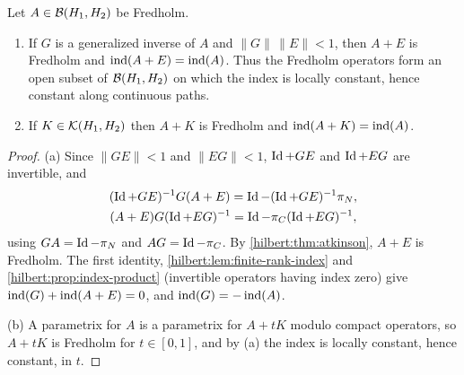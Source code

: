 \begin{theorem}\label{hilbert:thm:stability}
Let $A\in\mathcal{B}(H_1,H_2)$ be Fredholm.
\begin{enumerate}[label=\textup{(\alph*)}]
\item If $G$ is a generalized inverse of $A$ and $\|G\|\,\|E\|<1$, then $A+E$ is Fredholm and
$\operatorname{ind}(A+E)=\operatorname{ind}(A)$. Thus the Fredholm operators form an open subset of $\mathcal{B}(H_1,H_2)$ on
which the index is locally constant, hence constant along continuous paths.
\item If $K\in\mathcal{K}(H_1,H_2)$ then $A+K$ is Fredholm and $\operatorname{ind}(A+K)=\operatorname{ind}(A)$.
\end{enumerate}
\end{theorem}
\begin{proof}
(a) Since $\|GE\|<1$ and $\|EG\|<1$, $\operatorname{Id}+GE$ and $\operatorname{Id}+EG$ are invertible, and
\begin{gather*}
(\operatorname{Id}+GE)^{-1}G(A+E)=\operatorname{Id}-(\operatorname{Id}+GE)^{-1}\pi_N,\\ (A+E)G(\operatorname{Id}+EG)^{-1}=\operatorname{Id}-\pi_C(\operatorname{Id}+EG)^{-1},
\end{gather*}
using $GA=\operatorname{Id}-\pi_N$ and $AG=\operatorname{Id}-\pi_C$. By \cref{hilbert:thm:atkinson}, $A+E$ is Fredholm. The
first identity, \cref{hilbert:lem:finite-rank-index} and \cref{hilbert:prop:index-product}
(invertible operators having index zero) give $\operatorname{ind}(G)+\operatorname{ind}(A+E)=0$, and
$\operatorname{ind}(G)=-\operatorname{ind}(A)$.

(b) A parametrix for $A$ is a parametrix for $A+tK$ modulo compact operators, so $A+tK$ is
Fredholm for $t\in[0,1]$, and by (a) the index is locally constant, hence constant, in $t$.
\end{proof}

